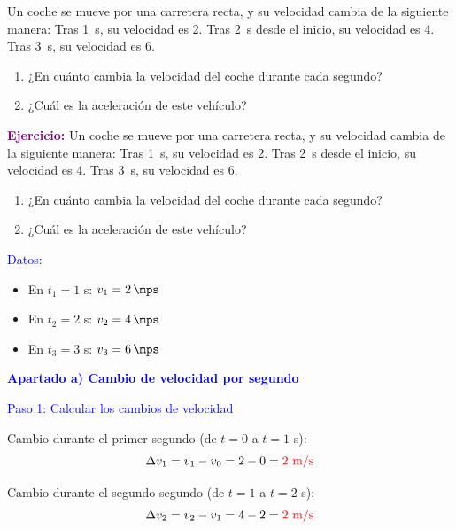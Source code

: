 \begin{exercise}
    Un coche se mueve por una carretera recta, y su velocidad cambia de la siguiente manera: Tras \qty{1}{\s}, su velocidad es \qty{2}{\mps}. Tras \qty{2}{\s} desde el inicio, su velocidad es \qty{4}{\mps}. Tras \qty{3}{\s}, su velocidad es \qty{6}{\mps}.

    \begin{enumerate}[label=\letraminuscula]
        \item ¿En cuánto cambia la velocidad del coche durante cada segundo?
        \item ¿Cuál es la aceleración de este vehículo?
    \end{enumerate}
    \begin{solu}
        \textbf{\textcolor{purple}{Ejercicio:}} Un coche se mueve por una carretera recta, y su velocidad cambia de la siguiente manera: Tras \qty{1}{\s}, su velocidad es \qty{2}{\mps}. Tras \qty{2}{\s} desde el inicio, su velocidad es \qty{4}{\mps}. Tras \qty{3}{\s}, su velocidad es \qty{6}{\mps}.
        \begin{enumerate}[label=\letraminuscula]
            \item ¿En cuánto cambia la velocidad del coche durante cada segundo?
            \item ¿Cuál es la aceleración de este vehículo?
        \end{enumerate}

        \vspace{0.3cm}

        \textcolor{blue}{Datos:}
        \begin{itemize}
            \item En $t_1 = 1$ s: $v_1 = \qty{2}{\mps}$
            \item En $t_2 = 2$ s: $v_2 = \qty{4}{\mps}$
            \item En $t_3 = 3$ s: $v_3 = \qty{6}{\mps}$
        \end{itemize}

        \textbf{\textcolor{blue}{Apartado a) Cambio de velocidad por segundo}}

        \textcolor{blue}{Paso 1: Calcular los cambios de velocidad}

        Cambio durante el primer segundo (de $t=0$ a $t=1$ s):
        \[
            \Delta v_1 = v_1 - v_0 = 2 - 0 = \textcolor{red}{2 \text{ m/s}}
        \]

        Cambio durante el segundo segundo (de $t=1$ a $t=2$ s):
        \[
            \Delta v_2 = v_2 - v_1 = 4 - 2 = \textcolor{red}{2 \text{ m/s}}
        \]


\end{solu}
\end{exercise}
